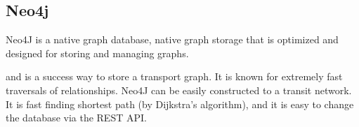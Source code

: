 
\par



\subsection{Neo4j}
Neo4J \citep{website:neo4j} is a native graph database, native graph storage that is optimized and designed for
storing and managing graphs.

and is a success way to store a transport graph. It is known for extremely fast traversals of relationships. Neo4J can be easily constructed to a transit network. It is fast finding shortest path (by Dijkstra's algorithm), and it is easy to change the database via the REST API. 

